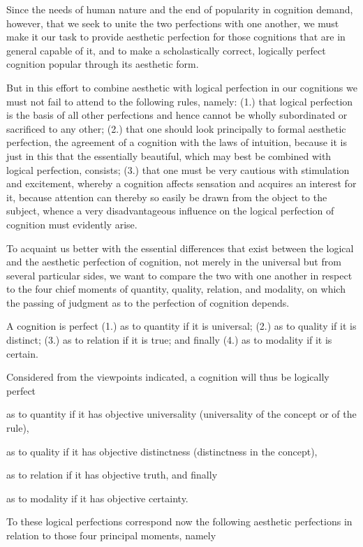     Since the needs of human nature
    and the end of popularity in cognition
    demand, however, that we seek to unite
    the two perfections with one another,
    we must make it our task to provide
    aesthetic perfection for those cognitions
    that are in general capable of it,
    and to make a scholastically correct,
    logically perfect cognition
    popular through its aesthetic form.

But in this effort to combine aesthetic with logical perfection
in our cognitions we must not fail to attend to the following rules, namely:
(1.) that logical perfection is the basis of all other perfections
and hence cannot be wholly subordinated or sacrificed to any other;
(2.) that one should look principally to formal aesthetic perfection,
the agreement of a cognition with the laws of intuition,
because it is just in this that the essentially beautiful,
which may best be combined with logical perfection, consists;
(3.) that one must be very cautious with stimulation and excitement,
whereby a cognition affects sensation and acquires an interest for it,
because attention can thereby so easily be drawn
from the object to the subject,
whence a very disadvantageous influence
on the logical perfection of cognition
must evidently arise.

To acquaint us better with the essential differences that exist between
the logical and the aesthetic perfection of cognition,
not merely in the universal but from several particular sides,
we want to compare the two with one another in respect to
the four chief moments of quantity, quality, relation, and modality,
on which the passing of judgment as to the perfection of cognition depends.

A cognition is perfect
(1.) as to quantity if it is universal;
(2.) as to quality if it is distinct;
(3.) as to relation if it is true; and finally
(4.) as to modality if it is certain.

Considered from the viewpoints indicated,
a cognition will thus be logically perfect

as to quantity if it has objective universality
    (universality of the concept or of the rule),

as to quality if it has objective distinctness
    (distinctness in the concept),

as to relation if it has objective truth, and finally

as to modality if it has objective certainty.

To these logical perfections correspond now the following aesthetic
perfections in relation to those four principal moments, namely

